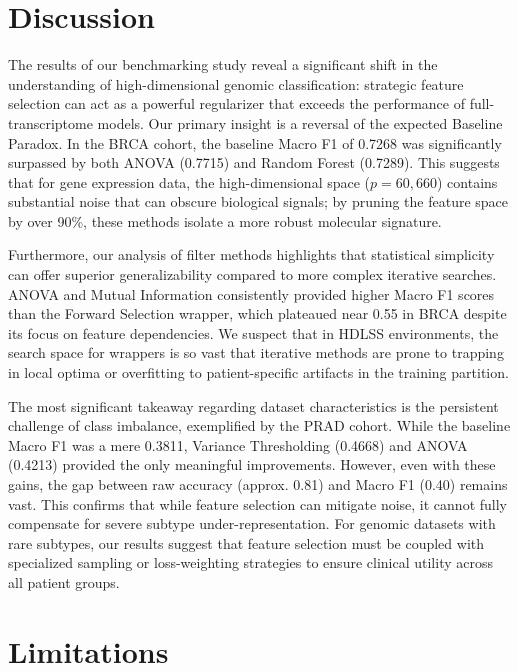 \documentclass{article}
\begin{document}
\section{Discussion}

The results of our benchmarking study reveal a significant shift in the understanding of high-dimensional genomic classification: strategic feature selection can act as a powerful regularizer that exceeds the performance of full-transcriptome models. Our primary insight is a reversal of the expected Baseline Paradox. In the BRCA cohort, the baseline Macro F1 of 0.7268 was significantly surpassed by both ANOVA (0.7715) and Random Forest (0.7289). This suggests that for gene expression data, the high-dimensional space ($p=60,660$) contains substantial noise that can obscure biological signals; by pruning the feature space by over 90\%, these methods isolate a more robust molecular signature.

Furthermore, our analysis of filter methods highlights that statistical simplicity can offer superior generalizability compared to more complex iterative searches. ANOVA and Mutual Information consistently provided higher Macro F1 scores than the Forward Selection wrapper, which plateaued near 0.55 in BRCA despite its focus on feature dependencies. We suspect that in HDLSS environments, the search space for wrappers is so vast that iterative methods are prone to trapping in local optima or overfitting to patient-specific artifacts in the training partition.

The most significant takeaway regarding dataset characteristics is the persistent challenge of class imbalance, exemplified by the PRAD cohort. While the baseline Macro F1 was a mere 0.3811, Variance Thresholding (0.4668) and ANOVA (0.4213) provided the only meaningful improvements. However, even with these gains, the gap between raw accuracy (approx. 0.81) and Macro F1 (0.40) remains vast. This confirms that while feature selection can mitigate noise, it cannot fully compensate for severe subtype under-representation. For genomic datasets with rare subtypes, our results suggest that feature selection must be coupled with specialized sampling or loss-weighting strategies to ensure clinical utility across all patient groups.








\section{Limitations}
\end{document}
